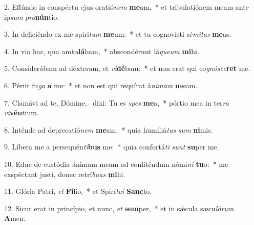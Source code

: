 2. Effúndo in conspéctu ejus oratió\textit{nem} \textbf{me}am,~*  et tribulatiónem meam ante ip\textit{sum} \textit{pro}\textbf{nún}tio.\

3. In deficiéndo ex me spíri\textit{tum} \textbf{me}um:~*  et tu cognovísti sé\textit{mi}\textit{tas} \textbf{me}as.\

4. In via hac, qua am\textit{bu}\textbf{lá}bam,~*  abscondérunt lá\textit{que}\textit{um} \textbf{mi}hi.\

5. Considerábam ad déxteram, et \textit{vi}\textbf{dé}bam:~*  et non erat qui co\textit{gnó}\textit{sce}\textbf{ret} me.\

6. Périit fu\textit{ga} \textbf{a} me:~*  et non est qui requírat á\textit{ni}\textit{mam} \textbf{me}am.\

7. Clamávi ad te, Dómine, \dag\  dixi: Tu es \textit{spes} \textbf{me}a,~*  pórtio mea in ter\textit{ra} \textit{vi}\textbf{vén}tium.\

8. Inténde ad deprecatió\textit{nem} \textbf{me}am:~*  quia humiliá\textit{tus} \textit{sum} \textbf{ni}mis.\

9. Líbera me a persequén\textit{ti}\textbf{bus} me:~*  quia confortá\textit{ti} \textit{sunt} \textbf{su}per me.\

10. Educ de custódia ánimam meam ad confiténdum nómi\textit{ni} \textbf{tu}o:~*  me exspéctant justi, donec retrí\textit{bu}\textit{as} \textbf{mi}hi.\

11. Glória Patri, \textit{et} \textbf{Fí}lio,~*  et Spirí\textit{tu}\textit{i} \textbf{Sanc}to.\

12. Sicut erat in princípio, et nunc, \textit{et} \textbf{sem}per,~*  et in sǽcula sæcu\textit{ló}\textit{rum}. \textbf{A}men.\

